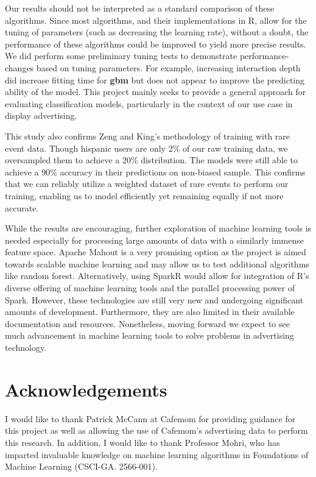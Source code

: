 \documentclass[twoside]{article}
\begin{document}
\begin{multicols}{2}
Our results should not be interpreted as a standard comparison of these algorithms. Since most algorithms, and their implementations in R, allow for the tuning of parameters (such as decreasing the learning rate), without a doubt, the performance of these algorithms could be improved to yield more precise results. We did perform some preliminary tuning tests to demonstrate performance-changes based on tuning parameters. For example, increasing interaction depth did increase fitting time for \textbf{gbm} but does not appear to improve the predicting ability of the model. This project mainly seeks to provide a general approach for evaluating classification models, particularly in the context of our use case in display advertising.

This study also confirms Zeng and King's methodology of training with rare event data. Though hispanic users are only 2\% of our raw training data, we oversampled them to achieve a 20\% distribution. The models were still able to achieve a 90\% accuracy in their predictions on non-biased sample. This confirms that we can reliably utilize a weighted dataset of rare events to perform our training, enabling us to model efficiently yet remaining equally if not more accurate.

While the results are encouraging, further exploration of machine learning tools is needed especially for processing large amounts of data with a similarly immense feature space. Apache Mahout is a very promising option as the project is aimed towards scalable machine learning and may allow us to test additional algorithms like random forest\cite{18}. Alternatively, using SparkR would allow for integration of R's diverse offering of machine learning tools and the parallel processing power of Spark\cite{8}. However, these technologies are still very new and undergoing significant amounts of development. Furthermore, they are also limited in their available documentation and resources. Nonetheless, moving forward we expect to see much advancement in machine learning tools to solve problems in advertising technology.


\section{Acknowledgements}

I would like to thank Patrick McCann at Cafemom for providing guidance for this project as well as allowing the use of Cafemom's advertising data to perform this research. In addition, I would like to thank Professor Mohri, who has imparted invaluable knowledge on machine learning algorithms in Foundations of Machine Learning (CSCI-GA. 2566-001).


\end{multicols}
\end{document}
